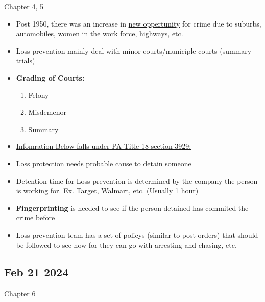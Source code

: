 \documentclass[12pt]{article}
\begin{document}
Chapter 4, 5

\begin{itemize}
		  \item Post 1950, there was an increase in \underline{new oppertunity} for crime due to
					suburbs, automobiles, women in the work force, highways, etc. 
		  \item Loss prevention mainly deal with minor courts/municiple courts (summary trials)
		  \item \textbf{Grading of Courts:}
		  		\begin{enumerate}
		  				\item Felony
						\item Misdemenor
						\item Summary
		  		\end{enumerate}
		  \item \underline{Infomration Below falls under PA Title 18 section 3929:}
		  \item Loss protection needs \underline{probable cause} to detain someone
		  \item Detention time for Loss prevention is determined by the company the person is working for. Ex.
		  		Target, Walmart, etc. (Usually 1 hour)
		  \item \textbf{Fingerprinting} is needed to see if the person detained has commited the crime before
		  \item Loss prevention team has a set of policys (similar to post orders) that should be followed
		  		to see how for they can go with arresting and chasing, etc.
\end{itemize}

\subsection*{Feb 21 2024}

Chapter 6
\end{document}
